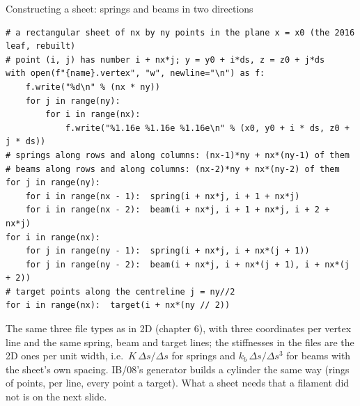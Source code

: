\documentclass[aspectratio=169,11pt]{beamer}
\begin{document}
\begin{frame}[fragile]{Constructing a sheet: springs and beams in two directions}
\label{fr:sheet}
\begin{lstlisting}[style=pythontiny]
# a rectangular sheet of nx by ny points in the plane x = x0 (the 2016 leaf, rebuilt)
# point (i, j) has number i + nx*j; y = y0 + i*ds, z = z0 + j*ds
with open(f"{name}.vertex", "w", newline="\n") as f:
    f.write("%d\n" % (nx * ny))
    for j in range(ny):
        for i in range(nx):
            f.write("%1.16e %1.16e %1.16e\n" % (x0, y0 + i * ds, z0 + j * ds))
# springs along rows and along columns: (nx-1)*ny + nx*(ny-1) of them
# beams along rows and along columns: (nx-2)*ny + nx*(ny-2) of them
for j in range(ny):
    for i in range(nx - 1):  spring(i + nx*j, i + 1 + nx*j)
    for i in range(nx - 2):  beam(i + nx*j, i + 1 + nx*j, i + 2 + nx*j)
for i in range(nx):
    for j in range(ny - 1):  spring(i + nx*j, i + nx*(j + 1))
    for j in range(ny - 2):  beam(i + nx*j, i + nx*(j + 1), i + nx*(j + 2))
# target points along the centreline j = ny//2
for i in range(nx):  target(i + nx*(ny // 2))
\end{lstlisting}
\footnotesize The same three file types as in 2D (chapter 6), with three coordinates per vertex line and the same spring, beam and target lines; the stiffnesses in the files are the 2D ones per unit width, i.e.\ $K\,\Delta s/\Delta s$ for springs and $k_b\,\Delta s/\Delta s^3$ for beams with the sheet's own spacing. IB/08's generator builds a cylinder the same way (rings of points,  per line, every point a target). What a sheet needs that a filament did not is on the next slide.
\end{frame}
\end{document}
